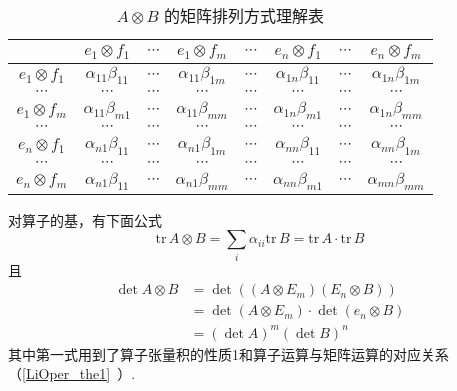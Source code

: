 \begin{table}[ht]
\centering
\caption{ $A\otimes B$ 的矩阵排列方式理解表}\label{TPofLO_tab1}
\begin{tabular}{|c|c|c|c|c|c|c|c|}
\hline
 & $e_1\otimes f_1$ & $\cdots$ & $e_1\otimes f_m$ & $\cdots$ & $e_n\otimes f_1$ & $\cdots$ & $e_n\otimes f_m$ \\
\hline
$e_1\otimes f_1$ & $\alpha_{11}\beta_{11}$ & $\cdots$ & $\alpha_{11}\beta_{1m}$ & $\cdots$ & $\alpha_{1n}\beta_{11}$ & $\cdots$ & $\alpha_{1n}\beta_{1m}$ \\
\hline
$\cdots$ & $\cdots$ & $\cdots$ & $\cdots$ & $\cdots$ & $\cdots$ & $\cdots$ & $\cdots$ \\
\hline
$e_1\otimes f_m$ & $\alpha_{11}\beta_{m1}$ & $\cdots$ & $\alpha_{11}\beta_{mm}$ & $\cdots$ & $\alpha_{1n}\beta_{m1}$ & $\cdots$ & $\alpha_{1n}\beta_{mm}$ \\
\hline
$\cdots$ & $\cdots$ & $\cdots$ & $\cdots$ & $\cdots$ & $\cdots$ & $\cdots$ & $\cdots$ \\
\hline
$e_n\otimes f_1$ &  $\alpha_{n1}\beta_{11}$ & $\cdots$ & $\alpha_{n1}\beta_{1m}$ & $\cdots$ & $\alpha_{nn}\beta_{11}$ & $\cdots$ & $\alpha_{nn}\beta_{1m}$ \\
\hline
$\cdots$ & $\cdots$ & $\cdots$ & $\cdots$ & $\cdots$ & $\cdots$ & $\cdots$ & $\cdots$ \\
\hline
$e_n\otimes f_m$ & $\alpha_{n1}\beta_{11}$ & $\cdots$ & $\alpha_{n1}\beta_{mm}$ & $\cdots$ & $\alpha_{nn}\beta_{m1}$ & $\cdots$ & $\alpha_{mn}\beta_{mm}$\\
\hline
\end{tabular}
\end{table}

对算子的基，有下面公式
\begin{equation}
\mathrm{tr}\,A\otimes B=\sum_{i}\alpha_{ii}\mathrm{tr}\,B=\mathrm{tr}\,A\cdot\mathrm{tr}\,B
\end{equation}
且
\begin{equation}
\begin{aligned}
\det A\otimes B&=\det((A\otimes E_m)(E_n\otimes B))\\
&=\det(A\otimes E_m)\cdot\det(e_n\otimes B)\\
&=(\det A)^m(\det B)^n
\end{aligned}
\end{equation}
其中第一式用到了算子张量积的性质1和算子运算与矩阵运算的对应关系（\autoref{LiOper_the1}~）.
